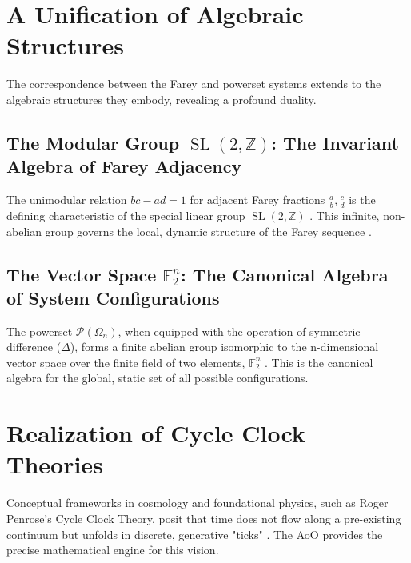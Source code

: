 \documentclass[12pt,a4paper]{article}
\theoremstyle{plain}
\theoremstyle{definition}
\theoremstyle{remark}
\newcommand{\integers}{\mathbb{Z}}
\newcommand{\fieldF}{\mathbb{F}}
\DeclareMathOperator{\SL}{SL}
\newcommand{\powerset}{\mathcal{P}}
\begin{document}
\section{A Unification of Algebraic Structures}
The correspondence between the Farey and powerset systems extends to the algebraic structures they embody, revealing a profound duality.

\subsection{The Modular Group \texorpdfstring{$\SL(2,\integers)$}{SL(2,Z)}: The Invariant Algebra of Farey Adjacency}
The unimodular relation $bc-ad=1$ for adjacent Farey fractions $\frac{a}{b}, \frac{c}{d}$ is the defining characteristic of the special linear group $\SL(2,\integers)$ \cite{ConradSL2Z}. This infinite, non-abelian group governs the local, dynamic structure of the Farey sequence \cite{ConwayTopograph}.

\subsection{The Vector Space \texorpdfstring{$\fieldF_2^n$}{F2n}: The Canonical Algebra of System Configurations}
The powerset $\powerset(\Omega_n)$, when equipped with the operation of symmetric difference ($\Delta$), forms a finite abelian group isomorphic to the n-dimensional vector space over the finite field of two elements, $\fieldF_2^n$ \cite{DummitFoote}. This is the canonical algebra for the global, static set of all possible configurations.

\section{Realization of Cycle Clock Theories}
Conceptual frameworks in cosmology and foundational physics, such as Roger Penrose's Cycle Clock Theory, posit that time does not flow along a pre-existing continuum but unfolds in discrete, generative "ticks" \cite{PenroseCycles}. The AoO provides the precise mathematical engine for this vision.
\end{document}
